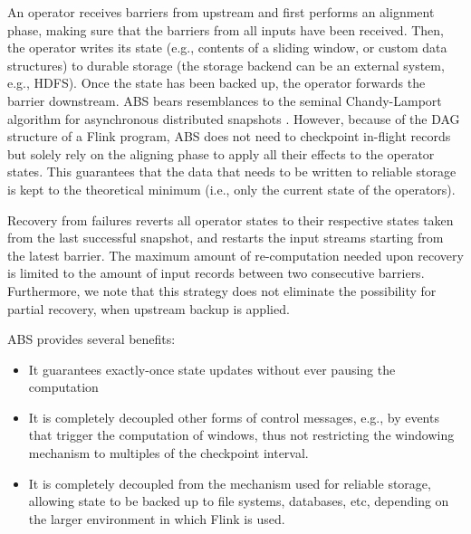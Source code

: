 An operator receives barriers from upstream and first performs an alignment phase, making sure that the barriers from all inputs have been received. Then, the operator writes its state (e.g., contents of a sliding window, or custom data structures) to durable storage (the storage backend can be an external system, e.g., HDFS). Once the state has been backed up, the operator forwards the barrier downstream. ABS bears resemblances to the seminal Chandy-Lamport algorithm for asynchronous distributed snapshots \cite{chandy1985distributed}. However, because of the DAG structure of a Flink program, ABS does not need to checkpoint in-flight records but solely rely on the aligning phase to apply all their effects to the operator states. This guarantees that the data that needs to be written to reliable storage is kept to the theoretical minimum (i.e., only the current state of the operators).

Recovery from failures reverts all operator states to their respective states taken from the last successful snapshot, and restarts the input streams starting from the latest barrier. The maximum amount of re-computation needed upon recovery is limited to the amount of input records between two consecutive barriers. Furthermore,  we note that this strategy does not eliminate the possibility for partial recovery, when upstream backup is applied.

\vspace{1mm}
\noindent ABS provides several benefits:\vspace{-2mm}
\begin{itemize}
\item It guarantees exactly-once state updates without ever pausing the computation \vspace{-3mm}
\item It is completely decoupled other forms of control messages, e.g., by events that trigger the computation of windows, thus not restricting the windowing mechanism to multiples of the checkpoint interval. \vspace{-3mm}
\item It is completely decoupled from the mechanism used for reliable storage, allowing state to be backed up to file systems, databases, etc, depending on the larger environment in which Flink is used.
\end{itemize}
